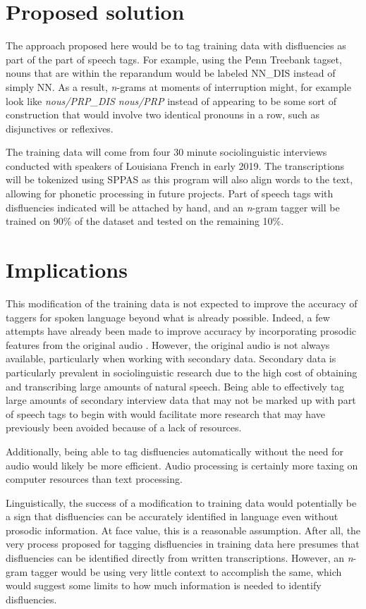 \documentclass{article}
\newcommand{\lexi}[1]{\textit{#1}}
\begin{document}
  \section{Proposed solution}
    The approach proposed here would be to tag training data with disfluencies as part of the part of speech tags.
    For example, using the Penn Treebank tagset, nouns that are within the reparandum would be labeled NN\_DIS instead of simply NN.
    As a result, \emph{n}-grams at moments of interruption might, for example look like \lexi{nous/PRP\_DIS nous/PRP} instead of appearing to be some sort of construction that would involve two identical pronouns in a row, such as disjunctives or reflexives.

    The training data will come from four 30 minute sociolinguistic interviews conducted with speakers of Louisiana French in early 2019.
    The transcriptions will be tokenized using SPPAS \parencite{bigi_sppas_2015} as this program will also align words to the text, allowing for phonetic processing in future projects.
    Part of speech tags with disfluencies indicated will be attached by hand, and an \emph{n}-gram tagger will be trained on 90\% of the dataset and tested on the remaining 10\%.

  \section{Implications}
    This modification of the training data is not expected to improve the accuracy of taggers for spoken language beyond what is already possible.
    Indeed, a few attempts have already been made to improve accuracy by incorporating prosodic features from the original audio \parencite[e.g.,][]{christodoulides_dismo:_2018}.
    However, the original audio is not always available, particularly when working with secondary data.
    Secondary data is particularly prevalent in sociolinguistic research due to the high cost of obtaining and transcribing large amounts of natural speech.
    Being able to effectively tag large amounts of secondary interview data that may not be marked up with part of speech tags to begin with would facilitate more research that may have previously been avoided because of a lack of resources.

    Additionally, being able to tag disfluencies automatically without the need for audio would likely be more efficient.
    Audio processing is certainly more taxing on computer resources than text processing.

    Linguistically, the success of a modification to training data would potentially be a sign that disfluencies can be accurately identified in language even without prosodic information.
    At face value, this is a reasonable assumption.
    After all, the very process proposed for tagging disfluencies in training data here presumes that disfluencies can be identified directly from written transcriptions.
    However, an \emph{n}-gram tagger would be using very little context to accomplish the same, which would suggest some limits to how much information is needed to identify disfluencies.


  \printbibliography
\end{document}
